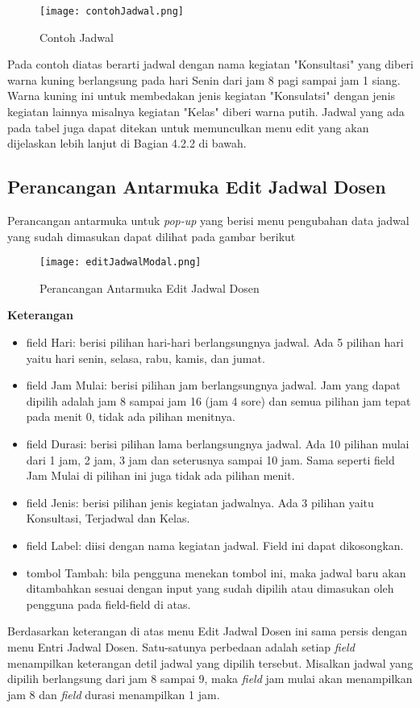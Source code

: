 \begin{enumerate}
		\begin{figure} [H]
			\centering  
			\texttt{[image: contohJadwal.png]}
			\caption[Contoh Jadwal]{Contoh Jadwal} 
			\label{fig:flow-chart-CodeIgniter} 
		\end{figure}
		Pada contoh diatas berarti jadwal dengan nama kegiatan "Konsultasi" yang diberi warna kuning berlangsung pada hari Senin dari jam 8 pagi sampai jam 1 siang. Warna kuning ini untuk membedakan jenis kegiatan "Konsulatsi" dengan jenis kegiatan lainnya misalnya kegiatan "Kelas" diberi warna putih. Jadwal yang ada pada tabel juga dapat ditekan untuk memunculkan menu edit yang akan dijelaskan lebih lanjut di Bagian 4.2.2 di bawah.
\end{enumerate}
\subsection{Perancangan Antarmuka Edit Jadwal Dosen}
Perancangan antarmuka untuk \textit{pop-up} yang berisi menu pengubahan data jadwal yang sudah dimasukan dapat dilihat pada gambar berikut
\begin{figure} [H]
	\centering  
	\texttt{[image: editJadwalModal.png]}
	\caption[Perancangan Antarmuka Edit Jadwal Dosen]{Perancangan Antarmuka Edit Jadwal Dosen} 
	\label{fig:flow-chart-CodeIgniter} 
\end{figure}
\textbf{Keterangan}
\begin{itemize}
		\item field Hari: berisi pilihan hari-hari berlangsungnya jadwal. Ada 5 pilihan hari yaitu hari senin, selasa, rabu, kamis, dan jumat.
		\item field Jam Mulai: berisi pilihan jam berlangsungnya jadwal. Jam yang dapat dipilih adalah jam 8 sampai jam 16 (jam 4 sore) dan semua 		pilihan jam tepat pada menit 0, tidak ada pilihan menitnya.
		\item field Durasi: berisi pilihan lama berlangsungnya jadwal. Ada 10 pilihan mulai dari 1 jam, 2 jam, 3 jam dan seterusnya sampai 10 			jam. Sama seperti field Jam Mulai di pilihan ini juga tidak ada pilihan menit.
		\item field Jenis: berisi pilihan jenis kegiatan jadwalnya. Ada 3 pilihan yaitu Konsultasi, Terjadwal dan Kelas.
		\item field Label: diisi dengan nama kegiatan jadwal. Field ini dapat dikosongkan.
		\item tombol Tambah: bila pengguna menekan tombol ini, maka jadwal baru akan ditambahkan sesuai dengan input yang sudah dipilih atau dimasukan oleh pengguna pada field-field di atas.
	\end{itemize}
Berdasarkan keterangan di atas menu Edit Jadwal Dosen ini sama persis dengan menu Entri Jadwal Dosen. Satu-satunya perbedaan adalah setiap \textit{field} menampilkan keterangan detil jadwal yang dipilih tersebut. Misalkan jadwal yang dipilih berlangsung dari jam 8 sampai 9, maka \textit{field} jam mulai akan menampilkan jam 8 dan \textit{field} durasi menampilkan 1 jam.

